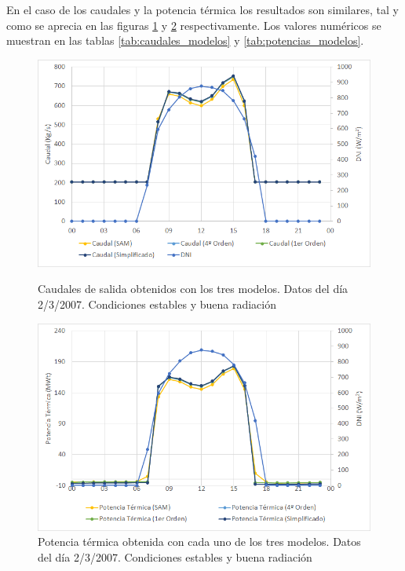 En el caso de los caudales y la potencia térmica  los resultados son similares, tal y como se aprecia en las figuras \ref{fig:caudales_modelos} y \ref{fig:potencias_modelos} respectivamente. Los valores numéricos se muestran en las tablas \ref{tab:caudales_modelos} y  \ref{tab:potencias_modelos}.

\begin{figure}[H]
\caption{Caudales de salida obtenidos con los tres modelos. Datos del día 2/3/2007. Condiciones estables y buena radiación} 
\includegraphics[width=0.9\linewidth]{images/caudales_modelos.png}
\label{fig:caudales_modelos}
\end{figure}

\begin{figure}[H]
\includegraphics[width=0.9\linewidth]{images/potencias_modelos.png}
\caption{Potencia térmica obtenida con cada uno de los tres modelos. Datos del día 2/3/2007. Condiciones estables y buena radiación} 
\label{fig:potencias_modelos}
\end{figure}

